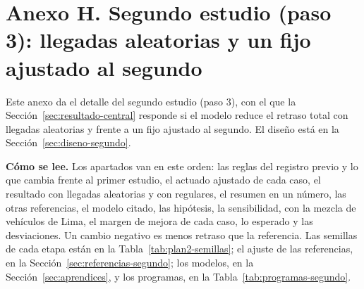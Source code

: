 \section*{Anexo H. Segundo estudio (paso 3): llegadas aleatorias y un fijo ajustado al segundo}
{}
\setcounter{table}{0}
\renewcommand{\thetable}{H.\arabic{table}}
\renewcommand{\theHtable}{H.\arabic{table}}
\setcounter{figure}{0}
\renewcommand{\thefigure}{H.\arabic{figure}}
\renewcommand{\theHfigure}{H.\arabic{figure}}
\setcounter{equation}{0}
\renewcommand{\theequation}{H.\arabic{equation}}
\renewcommand{\theHequation}{H.\arabic{equation}}

Este anexo da el detalle del segundo estudio (paso 3), con el que la
Sección~\ref{sec:resultado-central} responde si el modelo reduce el
retraso total con llegadas aleatorias y frente a un fijo ajustado al
segundo. El diseño está en la Sección~\ref{sec:diseno-segundo}.


\textbf{Cómo se lee.} Los apartados van en este orden: las reglas del
registro previo y lo que cambia frente al primer estudio, el actuado
ajustado de cada caso, el resultado con llegadas aleatorias y con
regulares, el resumen en un número, las otras referencias, el modelo
citado, las hipótesis, la sensibilidad, con la mezcla de vehículos de
Lima, el margen de mejora de cada caso, lo esperado y las desviaciones. Un cambio negativo es menos retraso que la
referencia. Las semillas de cada etapa están en la
Tabla~\ref{tab:plan2-semillas}; el ajuste de las referencias, en la
Sección~\ref{sec:referencias-segundo}; los modelos, en la
Sección~\ref{sec:aprendices}, y los programas, en la
Tabla~\ref{tab:programas-segundo}.


